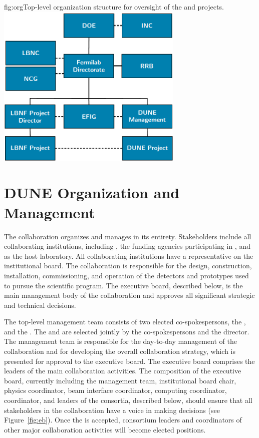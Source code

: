 \begin{dunefigure}	
{fig:org}{Top-level organization structure for oversight of the  and  projects.}
\includegraphics[width=0.67\textwidth]{graphics/lbnf_dune_org.png}  
\end{dunefigure}

\section{DUNE Organization and Management}

The  collaboration organizes and manages  in its entirety.  Stakeholders include all collaborating institutions, including , the funding agencies participating in , and  as the host laboratory.  All collaborating institutions have a representative on the  institutional board. The collaboration is responsible for the design, construction, installation, commissioning, and operation of the detectors and prototypes used to pursue the scientific program. The  executive board, described below, is the main management body of the collaboration and approves all significant strategic and technical decisions.

The top-level  management team consists of two elected co-spokespersons, the , and the . The  and  are selected jointly by the co-spokespersons and the  director. The management team is responsible for the day-to-day management of the collaboration and for developing the overall collaboration strategy, which is presented for approval to the executive board. The executive board comprises the leaders of the main collaboration activities. The composition of the executive board, currently including the  management team, institutional board chair, physics coordinator, beam interface coordinator, computing coordinator,  coordinator, and leaders of the  consortia, described below, should ensure
that all stakeholders in the collaboration have a voice in making decisions (see Figure~\ref{fig:eb}). 
Once the   is accepted, consortium leaders and coordinators of other major collaboration activities will become elected positions.


